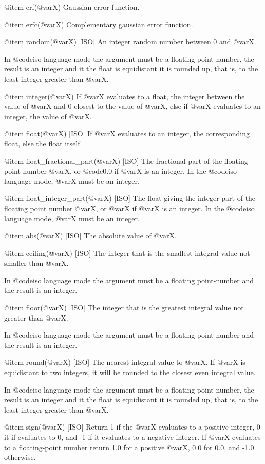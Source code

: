 {{{{@item erf(@var{X})
Gaussian error function.

@item erfc(@var{X})
Complementary gaussian error function.

@item random(@var{X}) [ISO]
An integer random number between 0 and @var{X}.

In @code{iso} language mode the argument must be a floating
point-number, the result is an integer and it the float is equidistant
it is rounded up, that is, to the least integer greater than @var{X}.

@item integer(@var{X})
If @var{X} evaluates to a float, the integer between the value of @var{X}
and 0 closest to the value of @var{X}, else if @var{X} evaluates to an
integer, the value of @var{X}.

@item float(@var{X}) [ISO]
If @var{X} evaluates to an integer, the corresponding float, else the float
itself.

@item float_fractional_part(@var{X}) [ISO]
The fractional part of the floating point number @var{X}, or @code{0.0}
if @var{X} is an integer. In the @code{iso} language mode,
@var{X} must be an integer.

@item float_integer_part(@var{X}) [ISO]
The float giving the integer part of the floating point number @var{X},
or @var{X} if @var{X} is an integer. In the @code{iso} language mode,
@var{X} must be an integer.

@item abs(@var{X}) [ISO]
The absolute value of @var{X}.

@item ceiling(@var{X}) [ISO]
The integer that is the smallest integral value not smaller than @var{X}.

In @code{iso} language mode the argument must be a floating
point-number and the result is an integer.

@item floor(@var{X}) [ISO]
The integer that is the greatest integral value not greater than @var{X}.

In @code{iso} language mode the argument must be a floating
point-number and the result is an integer.

@item round(@var{X}) [ISO]
The nearest integral value to @var{X}. If @var{X} is
equidistant to two integers, it will be rounded to the closest even
integral value.

In @code{iso} language mode the argument must be a floating
point-number, the result is an integer and it the float is equidistant
it is rounded up, that is, to the least integer greater than @var{X}.

@item sign(@var{X}) [ISO]
Return 1 if the @var{X} evaluates to a positive integer, 0 it if
evaluates to 0, and -1 if it evaluates to a negative integer. If @var{X}
evaluates to a floating-point number return 1.0 for a positive @var{X},
0.0 for 0.0, and -1.0 otherwise.

}}}}
